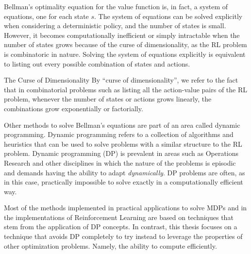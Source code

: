 Bellman's optimality equation for the value function is, in fact, a system of
equations, one for each state $s$. The system of equations can be solved
explicitly when considering a deterministic policy, and the number of states is
small. However, it becomes computationally inefficient or simply intractable
when the number of states grows because of the curse of dimensionality, as the
RL problem is combinatoric in nature. Solving the system of equations explicitly
is equivalent to listing out every possible combination of states and actions.

\begin{remark}{The Curse of Dimensionality}
	By ``curse of dimensionality'', we refer to the fact that in combinatorial
	problems such as listing all the action-value pairs of the RL problem,
	whenever the number of states or actions grows linearly, the combinations
	grow exponentially or factorially.
\end{remark}

Other methods to solve Bellman's equations are part of an area called dynamic
programming. Dynamic programming refers to a collection of algorithms and
heuristics that can be used to solve problems with a similar structure to the RL
problem. Dynamic programming (DP) is prevalent in areas such as Operations
Research and other disciplines in which the nature of the problems is episodic
and demands having the ability to adapt \textit{dynamically}. DP problems are
often, as in this case, practically impossible to solve exactly in a
computationally efficient way.

Most of the methods implemented in practical applications to solve MDPs and in
the implementations of Reinforcement Learning are based on techniques that stem
from the application of DP concepts. In contrast, this thesis focuses on a
technique that avoids DP completely to try instead to leverage the properties of
other optimization problems. Namely, the ability to compute efficiently.